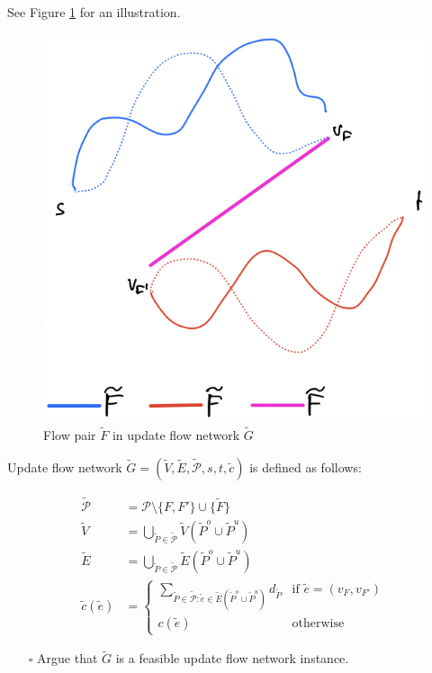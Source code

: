 \documentclass[fontsize=11pt,paper=a4]{book}
\begin{document}
See Figure \ref{fig:orgcd30670} for an illustration.

\begin{figure}[htbp]
\centering
\includegraphics[width=.9\linewidth]{../assets/Screen Shot 2023-02-19 at 13.29.07.png}
\caption{\label{fig:orgcd30670}Flow pair \(\tilde{F}\) in update flow network \(\tilde{G}\)}
\end{figure}

Update flow network \(\tilde{G}=(\tilde{V},\tilde{E},\tilde{\mathcal{P}},s,t,\tilde{c})\) is defined as follows:

\begin{align*}
\tilde{\mathcal{P}}&=\mathcal{P}\setminus\{F,F'\}\cup\{\tilde{F}\}\\
\tilde{V}&=\bigcup_{\tilde{P}\in\tilde{\mathcal{P}}}\tilde{V}(\tilde{P}^o\cup\tilde{P}^u)\\
\tilde{E}&=\bigcup_{\tilde{P}\in\tilde{\mathcal{P}}}\tilde{E}(\tilde{P}^o\cup\tilde{P}^u)\\
\tilde{c}(\tilde{e})&=
\begin{cases}
\sum_{\tilde{P}\in\tilde{\mathcal{P}}:\tilde{e}\in\tilde{E}(\tilde{P}^o\cup\tilde{P}^u)}d_{\tilde{P}} & \text{if }\tilde{e}=(v_F,v_{F'})\\
c(\tilde{e}) & \text{otherwise}
\end{cases}
\end{align*}

\begin{itemize}
\item[{$\square$}] Argue that \(\tilde{G}\) is a feasible update flow network instance.
\end{itemize}
\end{document}
